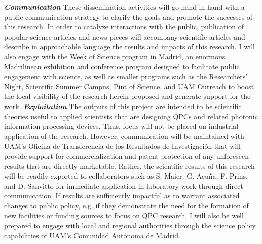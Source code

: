 \documentclass[11pt,a4paper]{article}
\begin{document}
\textbf{\textit{Communication}} These dissemination activities will go hand-in-hand with a public communication strategy to clarify the goals and promote the successes of this research. In order to catalyze interactions with the public, publication of popular science articles and news pieces will accompany scientific articles and describe in approachable language the results and impacts of this research. I will also engage with the Week of Science program in Madrid, an enormous Madrilinean exhibition and conference program designed to facilitate public engagement with science, as well as smaller programs such as the Researchers' Night, Scientific Summer Campus, Pint of Science, and UAM Outreach to boost the local visibility of the research herein proposed and generate support for the work. \textbf{\textit{Exploitation}} The outputs of this project are intended to be scientific theories useful to applied scientists that are designing QPCs and related photonic information processing devices. Thus, focus will not be placed on industrial application of the research. However, communication will be maintained with UAM's Oficina de Transferencia de los Resultados de Investigaci\'{o}n that will provide support for commercialization and patent protection of any unforeseen results that are directly marketable. Rather, the scientific results of this research will be readily exported to collaborators such as S. Maier, G. Acu\~{n}a, F. Prins, and D. Sanvitto for immediate application in laboratory work through direct communication. If results are sufficiently impactful as to warrant associated changes to public policy, e.g. if they demonstrate the need for the formation of new facilities or funding sources to focus on QPC research, I will also be well prepared to engage with local and regional authorities through the science policy capabilities of UAM's Comunidad Aut\'{o}noma de Madrid. 















\end{document}
